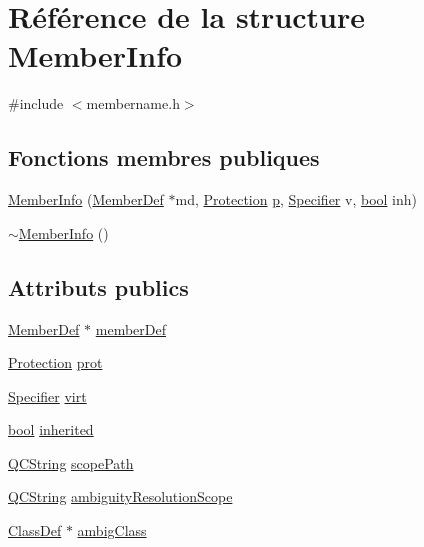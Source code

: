 \hypertarget{struct_member_info}{}\section{Référence de la structure Member\+Info}
\label{struct_member_info}


{\ttfamily \#include $<$membername.\+h$>$}

\subsection*{Fonctions membres publiques}
\begin{DoxyCompactItemize}
\item 
\hyperlink{struct_member_info_a89177bbf51a9fcc197e17a657dd158d8}{Member\+Info} (\hyperlink{class_member_def}{Member\+Def} $\ast$md, \hyperlink{types_8h_a90e352184df58cd09455fe9996cd4ded}{Protection} \hyperlink{060__command__switch_8tcl_a15229b450f26d8fa1c10bea4f3279f4d}{p}, \hyperlink{types_8h_ab16236bdd10ddf4d73a9847350f0017e}{Specifier} v, \hyperlink{qglobal_8h_a1062901a7428fdd9c7f180f5e01ea056}{bool} inh)
\item 
\hyperlink{struct_member_info_a9a476e68fd7082bae12f779505556e1d}{$\sim$\+Member\+Info} ()
\end{DoxyCompactItemize}
\subsection*{Attributs publics}
\begin{DoxyCompactItemize}
\item 
\hyperlink{class_member_def}{Member\+Def} $\ast$ \hyperlink{struct_member_info_aa3e6c8da8c43f5b7c4b257161d55f56e}{member\+Def}
\item 
\hyperlink{types_8h_a90e352184df58cd09455fe9996cd4ded}{Protection} \hyperlink{struct_member_info_acf86b775d4fb20140c6510e843b5d9b6}{prot}
\item 
\hyperlink{types_8h_ab16236bdd10ddf4d73a9847350f0017e}{Specifier} \hyperlink{struct_member_info_abcad9848a77db55ca329fbd675c5d2c5}{virt}
\item 
\hyperlink{qglobal_8h_a1062901a7428fdd9c7f180f5e01ea056}{bool} \hyperlink{struct_member_info_a4fb5f7b4dbec176b26cbbcb04b7ea981}{inherited}
\item 
\hyperlink{class_q_c_string}{Q\+C\+String} \hyperlink{struct_member_info_abff55577ccd419a0173058f1f0cb5d72}{scope\+Path}
\item 
\hyperlink{class_q_c_string}{Q\+C\+String} \hyperlink{struct_member_info_a5dbddc57482c0db5fcca254805eddc44}{ambiguity\+Resolution\+Scope}
\item 
\hyperlink{class_class_def}{Class\+Def} $\ast$ \hyperlink{struct_member_info_aa287cf44a7e8a776aa1cfbc815cad862}{ambig\+Class}
\end{DoxyCompactItemize}


